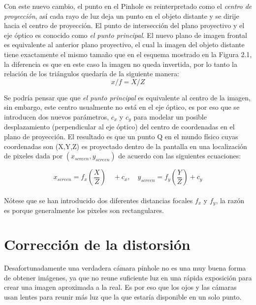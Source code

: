\documentclass{book}
\begin{document}
Con este nuevo cambio, el punto en el Pinhole es reinterpretado como el \textit{centro de proyección}, así cada rayo de luz deja un punto en el objeto distante y se dirije hacia el centro de proyección. El punto de intersección del plano proyectivo y el eje óptico es conocido como \textit{el punto principal}. El nuevo plano de imagen frontal es equivalente al anterior plano proyectivo, el cual la imagen del objeto distante tiene exactamente el mismo tamaño que en el esquema mostrado en la Figura 2.1, la diferencia es que en este caso la imagen no queda invertida, por lo tanto la relación de los triángulos quedaría de la siguiente manera: 
\[x/f = X/Z\]

Se podría pensar que que \textit{el punto principal} es equivalente al centro de la imagen, sin embargo, este centro usualmente no está en el eje óptico, es por eso que se introducen dos nuevos parámetros, $c_{x}$ y $c_{y}$ para modelar un posible desplazamiento (perpendicular al eje óptico) del centro de coordenadas en el plano de proyección. El resultado es que un punto Q en el mundo físico cuyas coordenadas son  (X,Y,Z) es proyectado dentro de la pantalla en una localización de pixeles dada por $(x_{screen},y_{screen})$ de acuerdo con las siguientes ecuaciones:

\[x_{screen}=f_{x}(\frac{X}{Z}) \quad + c_{x},\quad y_{screen}=f_{y}(\frac{Y}{Z}) + c_{y}\]	\\


Nótese que se han introducido dos diferentes distancias focales $f_{x}$ y $f_{y}$, la razón es porque generalmente los pixeles son rectangulares.
		
\section{Corrección de la distorsión}
Desafortunadamente una verdadera cámara pinhole no es una muy buena forma de obtener imágenes, ya que no reune suficiente luz en una rápida exposición para crear una imagen aproximada a la real. Es por eso que los ojos y las cámaras usan lentes para reunir más luz que la que estaría disponible en un solo punto.
\end{document}
